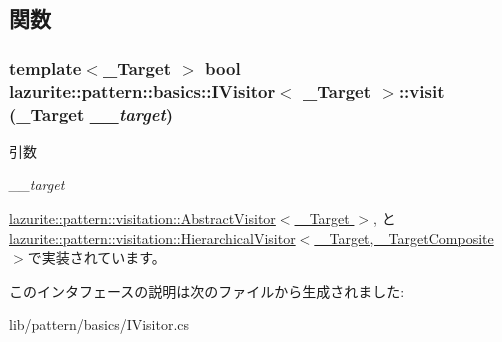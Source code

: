 \subsection{関数}
\hypertarget{interfacelazurite_1_1pattern_1_1basics_1_1_i_visitor_3_01___target_01_4_a9bf1df40e033ad9aec0a33bf6b426eca}{
\subsubsection[{visit}]{\setlength{\rightskip}{0pt plus 5cm}template$<$\_\-Target $>$ bool {\bf lazurite::pattern::basics::IVisitor}$<$ \_\-Target $>$::visit (\_\-Target {\em \_\-\_\-target})}}
\label{interfacelazurite_1_1pattern_1_1basics_1_1_i_visitor_3_01___target_01_4_a9bf1df40e033ad9aec0a33bf6b426eca}

\begin{DoxyParams}{引数}
\item[{\em \_\-\_\-target}]\end{DoxyParams}


\hyperlink{classlazurite_1_1pattern_1_1visitation_1_1_abstract_visitor_3_01___target_01_4_a82376a3bfa3b8356c6557cf30a0c0f9d}{lazurite::pattern::visitation::AbstractVisitor$<$ \_\-Target $>$}, と \hyperlink{classlazurite_1_1pattern_1_1visitation_1_1_hierarchical_visitor_3_01___target_00_01___target_composite_01_4_a34aa080c5269d28a0f8f0a14ff40c1db}{lazurite::pattern::visitation::HierarchicalVisitor$<$ \_\-Target, \_\-TargetComposite $>$}で実装されています。

このインタフェースの説明は次のファイルから生成されました:\begin{DoxyCompactItemize}
\item 
lib/pattern/basics/IVisitor.cs\end{DoxyCompactItemize}
